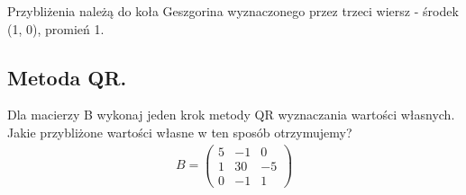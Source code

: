 \documentclass[main.tex]{subfiles}
\begin{document}
    Przybliżenia należą do koła Geszgorina wyznaczonego przez trzeci wiersz - środek (1, 0), promień 1.

    \subsection{Metoda QR.}

    \begin{exercise}
        Dla macierzy B wykonaj jeden krok metody QR wyznaczania wartości własnych. Jakie przybliżone wartości własne w
        ten sposób otrzymujemy?
        \begin{align*}
            B =
            \begin{pmatrix}
                5 & -1 & 0\\
                1 & 30 & -5\\
                0 & -1 & 1
            \end{pmatrix}
        \end{align*}
    \end{exercise}
\end{document}
